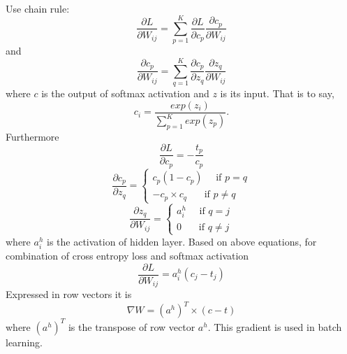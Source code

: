 \documentclass[12pt]{article}
\begin{document}
\\
Use chain rule:\begin{equation}
\frac{\partial L}{\partial W_{ij}} = \sum_{p=1}^K \frac{\partial L}{\partial c_p} \frac{\partial c_p}{\partial W_{ij}}
\end{equation}
and \begin{equation}
\frac{\partial c_p}{\partial W_{ij}}= \sum_{q=1}^K \frac{\partial c_p}{\partial z_q} \frac{\partial z_q}{\partial W_{ij}}
\end{equation}
where $c$ is the output of softmax activation and $z$ is its input. That is to say, \begin{equation}
c_i = \frac{exp(z_i)}{\sum_{p=1}^K exp(z_p)}.
\end{equation} Furthermore\begin{equation}
\frac{\partial L}{\partial c_p} = -\frac{t_p}{c_p}
\end{equation}
\begin{equation}
\frac{\partial c_p}{\partial z_q} = \begin{cases}
c_p(1-c_p)~~~~~~\text{if } p = q
\\
-c_p\times c_q~~~~~~~~\text{if } p \neq q
\end{cases}
\end{equation}
\begin{equation}
\frac{\partial z_q}{\partial W_{ij}} = \begin{cases}
a^h_i~~~~~~\text{if } q = j
\\
0~~~~~~~~\text{if } q \neq j
\end{cases}
\end{equation}
where $a^h_i$ is the activation of hidden layer. Based on above equations, for combination of cross entropy loss and softmax activation \begin{equation}
\frac{\partial L}{\partial W_{ij}} = a_i^h(c_j - t_j)
\end{equation}
Expressed in row vectors it is \begin{equation}
\nabla W = (a^h)^T\times (c - t)
\end{equation}
where $(a^h)^T$ is the transpose of row vector $a^h$. This gradient is used in batch learning.
\end{document}
